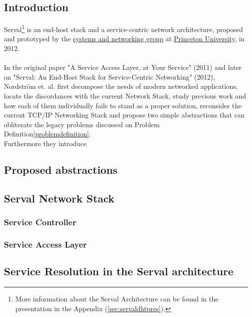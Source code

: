 \subsection{Introduction}
Serval\footnote{More information about the Serval Architecture can be found in the presentation in the Appendix (\ref{sec:servaldhtpres}).} is an end-host stack and a service-centric network architecture, proposed and prototyped by the \href{https://sns.cs.princeton.edu/}{systems and networking group} at \href{https://www.princeton.edu}{Princeton University}, in 2012.

\paragraph{} In the original paper "A Service Access Layer, at Your Service" (2011)\cite{Freedman2011} and later on "Serval: An End-Host Stack for Service-Centric Networking" (2012)\cite{Nordstrom2012}, Nordstr{\"o}m et. al. first decompose the needs of modern networked applications, locate the discordances with the current Network Stack, study previous work and how each of them individually fails to stand as a proper solution, reconsider the current TCP/IP Networking Stack and propose two simple abstractions that can obliterate the legacy problems discussed on Problem Definition\ref{problemdefinition}.\\
\indent Furthermore they introduce 	

\subsection{Proposed abstractions}



\subsection{Serval Network Stack}
\subsubsection{Service Controller}
\subsubsection{Service Access Layer}
\subsection{Service Resolution in the Serval architecture}

